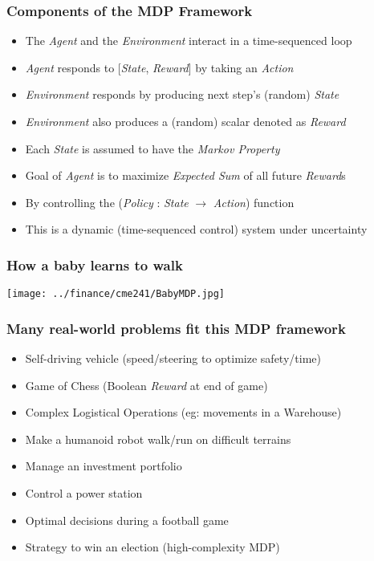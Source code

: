 \documentclass[handout]{beamer}
\begin{document}
\begin{frame}
\frametitle{Components of the MDP Framework}
\pause
\begin{itemize}[<+->]
\item The {\em Agent} and the {\em Environment} interact in a time-sequenced loop
\item {\em Agent} responds to [{\em State}, {\em Reward}] by taking an {\em Action}
\item {\em Environment} responds by producing next step's (random) {\em State}
\item {\em Environment} also produces a (random) scalar denoted as {\em Reward}
\item Each {\em State} is assumed to have the {\em Markov Property}
\item Goal of {\em Agent} is to maximize {\em Expected Sum} of all future {\em Reward}s
\item By controlling the ({\em Policy} : {\em State} $\rightarrow$ {\em Action}) function
\item This is a dynamic (time-sequenced control) system under uncertainty
\end{itemize}
\end{frame}

\begin{frame}
\frametitle{How a baby learns to walk}
\texttt{[image: ../finance/cme241/BabyMDP.jpg]}
\end{frame}

\begin{frame}
\frametitle{Many real-world problems fit this MDP framework}
\pause
\begin{itemize}[<+->]
\item Self-driving vehicle (speed/steering to optimize safety/time)
\item Game of Chess (Boolean {\em Reward} at end of game)
\item Complex Logistical Operations (eg: movements in a Warehouse)
\item Make a humanoid robot walk/run on difficult terrains
\item Manage an investment portfolio
\item Control a power station
\item Optimal decisions during a football game
\item Strategy to win an election (high-complexity MDP)
\end{itemize}
\end{frame}
\end{document}
